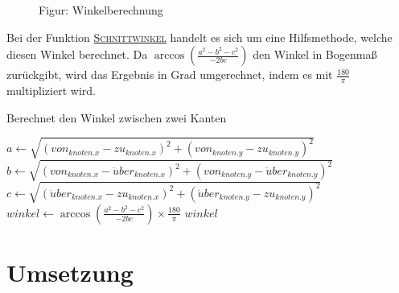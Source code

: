 \documentclass[a4paper,10pt,ngerman]{scrartcl}
\begin{document}
    \begin{figure}[H]
        \centering
        \caption{Figur: Winkelberechnung}\label{fig:figure2}
    \end{figure}

    Bei der Funktion \hyperref[alg:pseudo_crossangle]{\textsc{Schnittwinkel}} handelt es sich um eine Hilfsmethode, welche diesen Winkel berechnet.
    Da $\arccos\left(\frac{a^2 - b^2 - c^2}{-2bc}\right)$ den Winkel in Bogenmaß zurückgibt,
    wird das Ergebnis in Grad umgerechnet, indem es mit $\frac{180}{\pi}$ multipliziert wird.

    \begin{algorithm}[H]
        \caption{Berechnet den Winkel zwischen zwei Kanten}
        \begin{algorithmic}
                \State $\textit{a}\gets \sqrt{(von_{knoten.x} - zu_{knoten.x})^2 + (von_{knoten.y} - zu_{knoten.y})^2}$
                \State $\textit{b}\gets \sqrt{(von_{knoten.x} - \ddot uber_{knoten.x})^2 + (von_{knoten.y} - \ddot uber_{knoten.y})^2}$
                \State $\textit{c}\gets \sqrt{(\ddot uber_{knoten.x} - zu_{knoten.x})^2 + (\ddot uber_{knoten.y} - zu_{knoten.y})^2}$
                \State $\textit{winkel} \gets \arccos\left(\frac{a^2 - b^2 - c^2}{-2bc}\right) \times \frac{180}{\pi}$
                \State \Return $winkel$
            \EndFunction
        \end{algorithmic}\label{alg:pseudo_crossangle}
    \end{algorithm}

    \section{Umsetzung}\label{sec:umsetzung}
\end{document}
